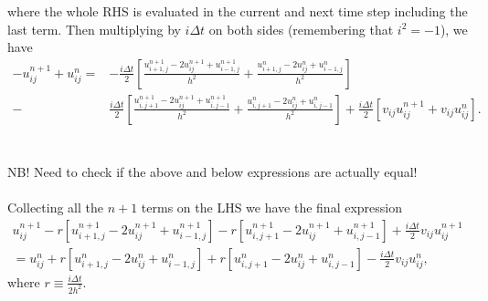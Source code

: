 \documentclass[english,notitlepage,reprint,nofootinbib]{revtex4-1}  %
\begin{document}
where the whole RHS is evaluated in the current and next time step including the last term. Then multiplying by $i\Delta t$ on both sides (remembering that $i^2 = -1$), we have
\begin{align}
    - u_{ij}^{n+1} + u_{ij}^n 
    =& - \frac{i\Delta t}{2} \left[ \frac{u_{i+1,j}^{n+1} -2u_{ij}^{n+1} + u_{i-1,j}^{n+1}}{h^2} 
    + \frac{u_{i+1,j}^{n} -2u_{ij}^{n} + u_{i-1,j}^{n}}{h^2} \right] \\
     -& \frac{i\Delta t}{2} \left[ \frac{u_{i,j+1}^{n+1} -2u_{ij}^{n+1} + u_{i,j-1}^{n+1}}{h^2}
     + \frac{u_{i,j+1}^{n} -2u_{ij}^{n} + u_{i,j-1}^{n}}{h^2} \right]
     + \frac{i\Delta t}{2} \left[ v_{ij}u_{ij}^{n+1} + v_{ij}u_{ij}^n \right]. 
\end{align}
\\ \\
NB! Need to check if the above and below expressions are actually equal!
\\ \\
Collecting all the $n+1$ terms on the LHS we have the final expression
\begin{align}
    u_{ij}^{n+1} - r \left[ u_{i+1,j}^{n+1}- 2 u_{ij}^{n+1} + u_{i-1,j}^{n+1} \right] 
    - r \left[ u_{i,j+1}^{n+1}- 2 u_{ij}^{n+1} + u_{i,j-1}^{n+1} \right] 
    + \frac{i \Delta t}{2} v_{ij} u_{ij}^{n+1} \\
    = u_{ij}^n 
    + r \left[ u_{i+1,j}^{n}- 2 u_{ij}^{n} + u_{i-1,j}^{n} \right] 
    + r \left[ u_{i,j+1}^{n}- 2 u_{ij}^{n} + u_{i,j-1}^{n} \right]
    - \frac{i \Delta t}{2} v_{ij} u_{ij}^{n},
\end{align}
where $r \equiv \frac{i \Delta t}{2h^2}$. 
\end{document}
